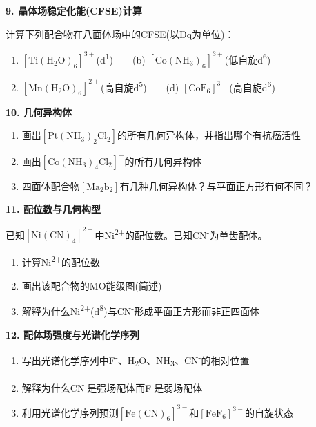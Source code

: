 \documentclass[a4paper,11pt]{ctexart}
\providecommand{\tightlist}{\setlength{\itemsep}{0pt}\setlength{\parskip}{0pt}}
\newcommand{\箭}{\ensuremath{\rightarrow}}
\newcommand{\左箭}{\ensuremath{\leftarrow}}
\newcommand{\上箭}{\ensuremath{\uparrow}}
\newcommand{\下箭}{\ensuremath{\downarrow}}
\newcommand{\衡}{\ensuremath{\rightleftharpoons}}
\newcommand{\双箭}{\ensuremath{\leftrightarrow}}
\newcommand{\约等于}{\ensuremath{\approx}}
\newcommand{\小于等于}{\ensuremath{\leq}}
\newcommand{\大于等于}{\ensuremath{\geq}}
\newcommand{\不等于}{\ensuremath{\neq}}
\newcommand{\西格马}{\ensuremath{\sigma}}
\newcommand{\派}{\ensuremath{\pi}}
\begin{document}
\textbf{9. 晶体场稳定化能(CFSE)计算}

计算下列配合物在八面体场中的CFSE(以Dq为单位)：

\begin{enumerate}
\def\labelenumi{(\alph{enumi})}
\tightlist
\item
  \(\mathrm{[Ti(H_2O)_6]^{3+}}\)(d\textsuperscript{1})　　(b) \(\mathrm{[Co(NH_3)_6]^{3+}}\)(低自旋d\textsuperscript{6})
\item
  \(\mathrm{[Mn(H_2O)_6]^{2+}}\)(高自旋d\textsuperscript{5})　　(d) \(\mathrm{[CoF_6]^{3-}}\)(高自旋d\textsuperscript{6})
\end{enumerate}

\textbf{10. 几何异构体}

\begin{enumerate}
\def\labelenumi{(\alph{enumi})}
\tightlist
\item
  画出\(\mathrm{[Pt(NH_3)_2Cl_2]}\)的所有几何异构体，并指出哪个有抗癌活性
\item
  画出\(\mathrm{[Co(NH_3)_4Cl_2]^+}\)的所有几何异构体
\item
  四面体配合物\(\mathrm{[Ma_2b_2]}\)有几种几何异构体？与平面正方形有何不同？
\end{enumerate}

\textbf{11. 配位数与几何构型}

已知\(\mathrm{[Ni(CN)_4]^{2-}}\)中Ni\textsuperscript{2+}的配位数。已知CN\textsuperscript{-}为单齿配体。

\begin{enumerate}
\def\labelenumi{(\alph{enumi})}
\tightlist
\item
  计算Ni\textsuperscript{2+}的配位数
\item
  画出该配合物的MO能级图(简述)
\item
  解释为什么Ni\textsuperscript{2+}(d\textsuperscript{8})与CN\textsuperscript{-}形成平面正方形而非正四面体
\end{enumerate}

\textbf{12. 配体场强度与光谱化学序列}

\begin{enumerate}
\def\labelenumi{(\alph{enumi})}
\tightlist
\item
  写出光谱化学序列中F\textsuperscript{-}、H\textsubscript{2}O、NH\textsubscript{3}、CN\textsuperscript{-}的相对位置
\item
  解释为什么CN\textsuperscript{-}是强场配体而F\textsuperscript{-}是弱场配体
\item
  利用光谱化学序列预测\(\mathrm{[Fe(CN)_6]^{3-}}\)和\(\mathrm{[FeF_6]^{3-}}\)的自旋状态
\end{enumerate}
\end{document}
